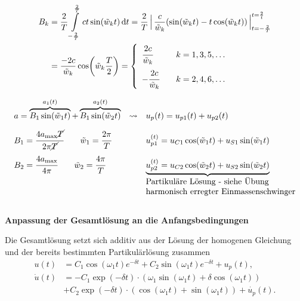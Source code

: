 \begin{solution}
\begin{align*}
     B_k &= \frac{2}{T} \int\limits_{-\frac{2}{T}}^{\frac{2}{T}} ct \sin(\tilde{w}_k t) \dd{t} = \frac{2}{T}\,\Big|\, \frac{c}{\tilde{w}_k}(\sin(\tilde{w}_k t)-t\cos(\tilde{w}_k t))\,\Big|_{t={-\frac{2}{T}}}^{t=\frac{2}{t}} \\
     &= \frac{-2c}{\tilde{w}_k} \cos(\tilde{w}_k\frac{T}{2}) =
     \left\{
     \begin{array}{lll}
     \cfrac{2c}{\tilde{w}_k} & &k = 1,3,5,\dots\\[1em]
     -\cfrac{2c}{\tilde{w}_k} & &k = 2,4,6,\dots
     \end{array}\right.
\end{align*}

\begin{align*}
     \begin{array}{lcl}
        a = \overbrace{B_1\sin(\tilde{w}_1 t)}^{a_1(t)} + \overbrace{B_1\sin(\tilde{w}_2 t)}^{a_2(t)} & \rightsquigarrow & u_p(t) = u_{p1}(t) + u_{p2}(t) \\[1em]
        B_1 = \cfrac{4a_{\max}\cancel{T}}{2\pi\cancel{T}} \qquad \tilde{w}_1 = \cfrac{2\pi}{T} && u_{p1}^{(t)} = u_{C1} \cos(\tilde{w}_1 t) + u_{S1} \sin(\tilde{w}_1 t) \\[1em]
        B_2 = \cfrac{4a_{\max}}{4\pi} \qquad \tilde{w}_2 = \cfrac{4\pi}{T}&& \underbrace{u_{p2}^{(t)} = u_{C2} \cos(\tilde{w}_2 t) + u_{S2} \sin(\tilde{w}_2 t)} \\
        &&\text{Partikuläre Lösung - siehe Übung}\\
        &&\text{harmonisch erregter Einmassenschwinger}
    \end{array}
\end{align*}\\[2em]

\textbf{Anpassung der Gesamtlösung an die Anfangsbedingungen}
    
    Die Gesamtlösung setzt sich additiv aus der Lösung der homogenen Gleichung und der bereits bestimmten Partikulärlösung zusammen
    \begin{align*}
        u(t) &= C_1\cos(\omega_1 t)e^{-\delta t} + C_2 \sin(\omega_1 t)e^{-\delta t} + u_p(t),\\
        \dot{u}(t) &= -C_1 \exp(-\delta t) \cdot (\omega_1 \sin(\omega_1 t) + \delta \cos(\omega_1 t)) \\ 
        &+ C_2 \exp(-\delta t) \cdot (\cos(\omega_1 t) + \sin(\omega_1 t)) + \dot{u_p}(t).\\
    \end{align*}


\end{solution}
